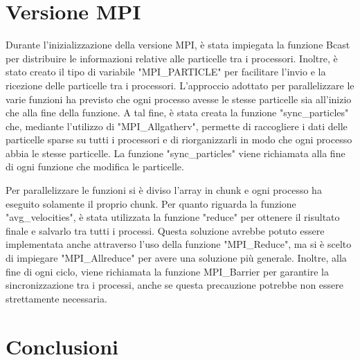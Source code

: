 \documentclass[a4paper,12pt, oneside]{article}
\begin{document}
\section{Versione MPI}

Durante l'inizializzazione della versione MPI, è stata impiegata la funzione Bcast per
distribuire le informazioni relative alle particelle tra i processori. Inoltre, è stato
creato il tipo di variabile "MPI\_PARTICLE" per facilitare l'invio e la ricezione delle
particelle tra i processori.
L'approccio adottato per parallelizzare le varie funzioni ha previsto che ogni processo
avesse le stesse particelle sia all'inizio che alla fine della funzione. A tal fine, è
stata creata la funzione "sync\_particles" che, mediante l'utilizzo di "MPI\_Allgatherv",
permette di raccogliere i dati delle particelle sparse su tutti i processori e di
riorganizzarli in modo che ogni processo abbia le stesse particelle. La funzione
"sync\_particles" viene richiamata alla fine di ogni funzione che modifica le particelle.

Per parallelizzare le funzioni si è diviso l'array in chunk e ogni processo ha eseguito
solamente il proprio chunk. Per quanto riguarda la funzione "avg\_velocities", è stata
utilizzata la funzione "reduce" per ottenere il risultato finale e salvarlo tra tutti i
processi. Questa soluzione avrebbe potuto essere implementata anche attraverso l'uso
della funzione "MPI\_Reduce", ma si è scelto di impiegare "MPI\_Allreduce" per avere 
una soluzione più generale.
Inoltre, alla fine di ogni ciclo, viene richiamata la funzione MPI_Barrier per garantire
la sincronizzazione tra i processi, anche se questa precauzione potrebbe non essere
strettamente necessaria.

\section{Conclusioni}
\end{document}
